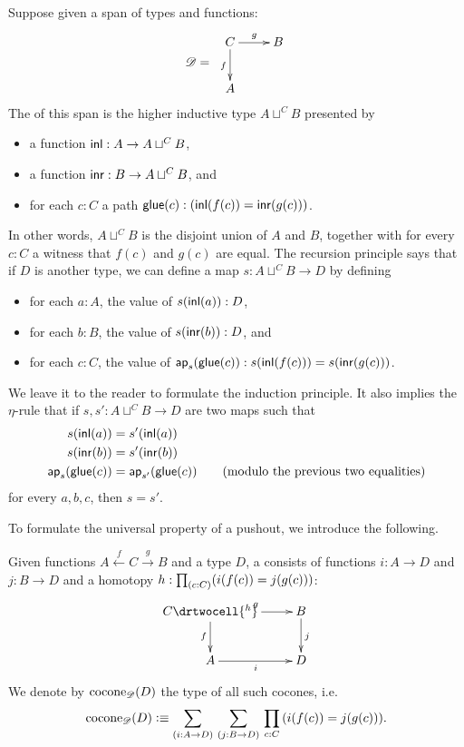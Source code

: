 Suppose given a span of types and functions:
\[\Ddiag=\;\vcenter{\xymatrix{C \ar^g[r] \ar_f[d] & B \\ A & }}\]
The  of this span is the higher inductive type $A\sqcup^CB$ presented by
\begin{itemize}
\item a function ${\mathsf{inl}}:A\to A\sqcup^CB$,
\item a function ${\mathsf{inr}}:B \to A\sqcup^CB$, and
\item for each $c:C$ a path $\mathsf{glue}(c):({\mathsf{inl}}(f(c))={\mathsf{inr}}(g(c)))$.
\end{itemize}
In other words, $A\sqcup^CB$ is the disjoint union of $A$ and $B$, together with for every $c:C$ a witness that $f(c)$ and $g(c)$ are equal.
The recursion principle says that if $D$ is another type, we can define a map $s:A\sqcup^CB\to{}D$ by defining
\begin{itemize}
\item for each $a:A$, the value of $s({\mathsf{inl}}(a)):D$,
\item for each $b:B$, the value of $s({\mathsf{inr}}(b)):D$, and
\item for each $c:C$, the value of $\mathsf{ap}_{s}(\mathsf{glue}(c)):s({\mathsf{inl}}(f(c)))=s({\mathsf{inr}}(g(c)))$.
\end{itemize}
We leave it to the reader to formulate the induction principle.
It also implies the $\eta$-rule that if $s,s':A\sqcup^CB\to{}D$ are two maps such that
\begin{align*}
  s({\mathsf{inl}}(a))&=s'({\mathsf{inl}}(a))\\
  s({\mathsf{inr}}(b))&=s'({\mathsf{inr}}(b))\\
  \mathsf{ap}_{s}(\mathsf{glue}(c))&=\mathsf{ap}_{s'}(\mathsf{glue}(c))
  \qquad\text{(modulo the previous two equalities)}
\end{align*}
for every $a,b,c$, then $s=s'$.

To formulate the universal property of a pushout, we introduce the following.

\begin{defn}\label{defn:cocone}
  Given functions $A \xleftarrow{f} C \xrightarrow{g} B$ and a type $D$, a  consists of functions $i:A\to{}D$ and $j:B\to{}D$ and a homotopy $h : \prd{c:C} (i(f(c))=j(g(c)))$:
  \[\uppercurveobject{{ }}\lowercurveobject{{ }}\twocellhead{{ }}
  \xymatrix{C \ar^g[r] \ar_f[d] \drtwocell{^h} & B \ar^j[d] \\ A \ar_i[r] & D
  }\]
  We denote by $\mathrm{cocone}_{\mathscr{D}}(D)$ the type of all such cocones, i.e.
  \[ \cocone{\Ddiag}{D} \defeq
  \sm{i:A\to D}{j:B\to D} \prd{c:C} (i(f(c))=j(g(c))).
  \]
\end{defn}

